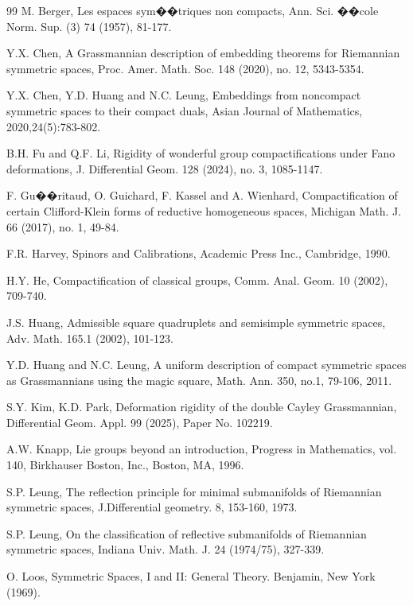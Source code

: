 \documentclass{article}
\begin{document}
\begin{thebibliography}{99}
M. Berger, Les espaces sym��triques non compacts, Ann. Sci. ��cole Norm. Sup. (3) 74 (1957), 81-177.

Y.X. Chen, A Grassmannian description of embedding theorems for Riemannian symmetric spaces, Proc. Amer. Math. Soc. 148 (2020), no. 12, 5343-5354.

Y.X. Chen, Y.D. Huang and N.C. Leung, Embeddings from noncompact symmetric spaces to their compact duals, Asian Journal of Mathematics, 2020,24(5):783-802.

B.H. Fu and Q.F. Li, Rigidity of wonderful group compactifications under Fano deformations,
J. Differential Geom. 128 (2024), no. 3, 1085-1147.


F. Gu��ritaud, O. Guichard, F. Kassel   and  A. Wienhard, Compactification of certain Clifford-Klein forms of reductive homogeneous spaces, Michigan Math. J. 66 (2017), no. 1, 49-84.

F.R. Harvey, Spinors and Calibrations, Academic Press Inc., Cambridge, 1990.

H.Y. He, Compactification of classical groups, Comm. Anal. Geom. 10 (2002), 709-740.


J.S. Huang, Admissible square quadruplets and semisimple symmetric spaces, Adv. Math. 165.1 (2002), 101-123.


Y.D. Huang and N.C. Leung, A uniform description of compact symmetric spaces as
Grassmannians using the magic square, Math. Ann. 350, no.1, 79-106, 2011.

S.Y. Kim,  K.D. Park, Deformation rigidity of the double Cayley Grassmannian,
Differential Geom. Appl. 99 (2025), Paper No. 102219.


A.W. Knapp, Lie groups beyond an introduction, Progress in Mathematics, vol. 140, Birkhauser Boston, Inc., Boston, MA, 1996.



S.P. Leung,  The reflection principle for minimal submanifolds
of Riemannian symmetric spaces, J.Differential geometry. 8,
153-160, 1973.

S.P. Leung, On the classification of reflective submanifolds of Riemannian symmetric spaces,
Indiana Univ. Math. J. 24 (1974/75), 327-339.

O. Loos, Symmetric Spaces, I and II: General Theory. Benjamin, New York (1969).



\end{thebibliography}
\end{document}
